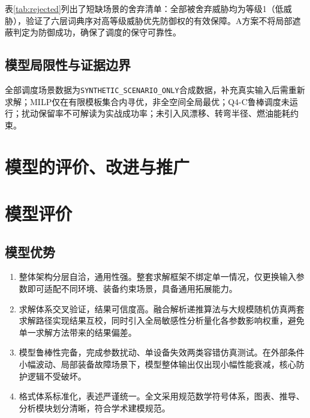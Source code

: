 \documentclass[withoutpreface,bwprint]{cumcmthesis}
\begin{document}
表\ref{tab:rejected}列出了短缺场景的舍弃清单：全部被舍弃威胁均为等级1（低威胁），验证了六层词典序对高等级威胁优先防御权的有效保障。A方案不将局部遮蔽判定为防御成功，确保了调度的保守可靠性。

\subsection{模型局限性与证据边界}
全部调度场景数据为\texttt{SYNTHETIC\_SCENARIO\_ONLY}合成数据，补充真实输入后需重新求解；MILP仅在有限模板集合内寻优，非全空间全局最优；Q4-C鲁棒调度未运行；扰动保留率不可解读为实战成功率；未引入风漂移、转弯半径、燃油能耗约束。



\section{模型的评价、改进与推广}

\section{模型评价}
\subsection{模型优势}
\begin{enumerate}
	\item 整体架构分层自洽，通用性强。整套求解框架不绑定单一情况，仅更换输入参数即可适配不同环境、装备约束场景，具备通用拓展能力。
	\item 求解体系交叉验证，结果可信度高。融合解析递推算法与大规模随机仿真两套求解路径实现结果互校，同时引入全局敏感性分析量化各参数影响权重，避免单一求解方法带来的结果偏差。
	\item 模型鲁棒性完备，完成参数扰动、单设备失效两类容错仿真测试。在外部条件小幅波动、局部装备故障场景下，模型整体输出仅出现小幅性能衰减，核心防护逻辑不受破坏。
	\item 格式体系标准化，表述严谨统一。全文采用规范数学符号体系，图表、推导、分析模块划分清晰，符合学术建模规范。
\end{enumerate}
\end{document}
